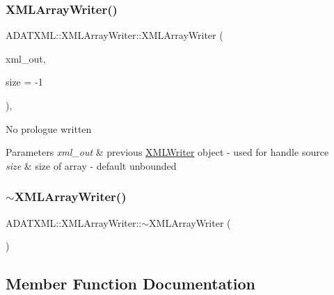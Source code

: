 \subsubsection{\texorpdfstring{XMLArrayWriter()}{XMLArrayWriter()}\hspace{0.1cm}{\footnotesize\ttfamily [2/2]}}
{\footnotesize\ttfamily A\+D\+A\+T\+X\+M\+L\+::\+X\+M\+L\+Array\+Writer\+::\+X\+M\+L\+Array\+Writer (\begin{DoxyParamCaption}\item[{\mbox{\hyperlink{classADATXML_1_1XMLWriter}{X\+M\+L\+Writer}} \&}]{xml\+\_\+out,  }\item[{int}]{size = {\ttfamily -\/1} }\end{DoxyParamCaption})\hspace{0.3cm}{\ttfamily [inline]}, {\ttfamily [explicit]}}

No prologue written 
\begin{DoxyParams}{Parameters}
{\em xml\+\_\+out} & previous \mbox{\hyperlink{classADATXML_1_1XMLWriter}{X\+M\+L\+Writer}} object -\/ used for handle source \\
\hline
{\em size} & size of array -\/ default unbounded \\
\hline
\end{DoxyParams}
\mbox{\label{classADATXML_1_1XMLArrayWriter_ac1e9df12a7df4c52d6026c3b814abf65}} 
\subsubsection{\texorpdfstring{$\sim$XMLArrayWriter()}{~XMLArrayWriter()}\hspace{0.1cm}{\footnotesize\ttfamily [2/2]}}
{\footnotesize\ttfamily A\+D\+A\+T\+X\+M\+L\+::\+X\+M\+L\+Array\+Writer\+::$\sim$\+X\+M\+L\+Array\+Writer (\begin{DoxyParamCaption}{ }\end{DoxyParamCaption})}



\subsection{Member Function Documentation}
\mbox{\label{classADATXML_1_1XMLArrayWriter_a89774ac16fd8636da94745ccba7add0a}} 

